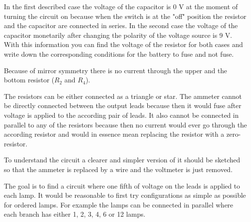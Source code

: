 \documentclass[11pt]{article}
\begin{document}

\hinteng
In the first described case the voltage of the capacitor is 0 V at the moment of turning the circuit on because when the switch is at the "off" position the resistor and the capacitor are connected in series. In the second case the voltage of the capacitor monetarily after changing the polarity of the voltage source is 9 V. With this information you can find the voltage of the resistor for both cases and write down the corresponding conditions for the battery to fuse and not fuse.
\probend
\bigskip


\hinteng
Because of mirror symmetry there is no current through the upper and the bottom resistor ($R_2$ and $R_4$).
\probend
\bigskip


\hinteng
The resistors can be either connected as a triangle or star. The ammeter cannot be directly connected between the output leads because then it would fuse after voltage is applied to the according pair of leads. It also cannot be connected in parallel to any of the resistors because then no current would ever go through the according resistor and would in essence mean replacing the resistor with a zero-resistor.
\probend
\bigskip


\hinteng
To understand the circuit a clearer and simpler version of it should be sketched so that the ammeter is replaced by a wire and the voltmeter is just removed.
\probend
\bigskip


\hinteng
The goal is to find a circuit where one fifth of voltage on the leads is applied to each lamp. It would be reasonable to first try configurations as simple as possible for ordered lamps. For example the lamps can be connected in parallel where each branch has either 1, 2, 3, 4, 6 or 12 lamps.
\probend
\bigskip
\end{document}
